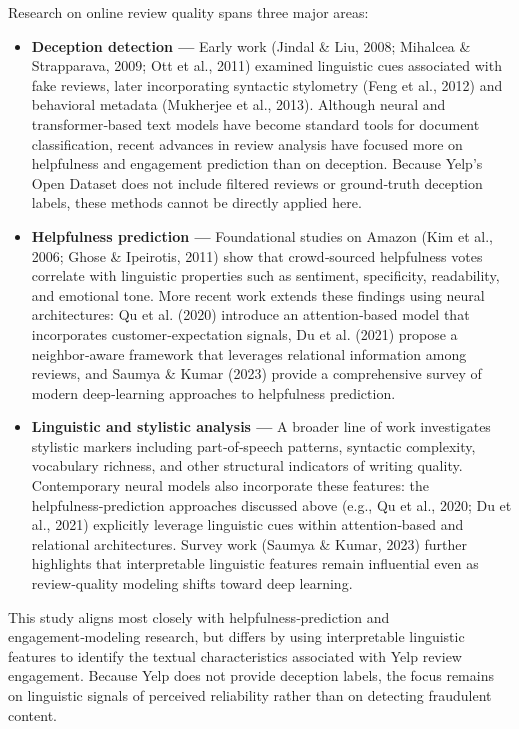 Research on online review quality spans three major areas:

\begin{itemize}

\item \textbf{Deception detection —}  
Early work (Jindal \& Liu, 2008; Mihalcea \& Strapparava, 2009; Ott et al., 2011) examined linguistic cues associated with fake reviews, later incorporating syntactic stylometry (Feng et al., 2012) and behavioral metadata (Mukherjee et al., 2013). Although neural and transformer‑based text models have become standard tools for document classification, recent advances in review analysis have focused more on helpfulness and engagement prediction than on deception. Because Yelp’s Open Dataset does not include filtered reviews or ground‑truth deception labels, these methods cannot be directly applied here.

\item \textbf{Helpfulness prediction —}  
Foundational studies on Amazon (Kim et al., 2006; Ghose \& Ipeirotis, 2011) show that crowd‑sourced helpfulness votes correlate with linguistic properties such as sentiment, specificity, readability, and emotional tone. More recent work extends these findings using neural architectures: Qu et al. (2020) introduce an attention‑based model that incorporates customer‑expectation signals, Du et al. (2021) propose a neighbor‑aware framework that leverages relational information among reviews, and Saumya \& Kumar (2023) provide a comprehensive survey of modern deep‑learning approaches to helpfulness prediction.

\item \textbf{Linguistic and stylistic analysis —}  
A broader line of work investigates stylistic markers including part‑of‑speech patterns, syntactic complexity, vocabulary richness, and other structural indicators of writing quality. Contemporary neural models also incorporate these features: the helpfulness‑prediction approaches discussed above (e.g., Qu et al., 2020; Du et al., 2021) explicitly leverage linguistic cues within attention‑based and relational architectures. Survey work (Saumya \& Kumar, 2023) further highlights that interpretable linguistic features remain influential even as review‑quality modeling shifts toward deep learning.

\end{itemize}

This study aligns most closely with helpfulness‑prediction and
engagement‑modeling research, but differs by using interpretable
linguistic features to identify the textual characteristics associated
with Yelp review engagement. Because Yelp does not provide deception
labels, the focus remains on linguistic signals of perceived reliability
rather than on detecting fraudulent content.

